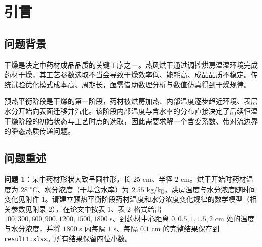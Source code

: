 \section{引言}

\subsection{问题背景}
干燥是决定中药材成品品质的关键工序之一。热风烘干通过调控烘房温湿环境完成药材干燥，其工艺参数选取不当会导致干燥效率低、能耗高、成品品质不稳定。传统试验优化模式成本高、周期长，亟需借助数理分析与数值仿真得到干燥规律。

预热平衡阶段是干燥的第一阶段，药材被烘房加热、内部温度逐步趋近环境、表层水分开始向表面迁移并汽化。该阶段内部温度与含水率的分布直接决定了后续恒温干燥阶段的初始状态与工艺时点的选取，因此需要求解一个含变系数、带对流边界的瞬态热质传递问题。

\subsection{问题重述}
\textbf{问题 1}：某中药材形状大致呈圆柱形，长 $25$ cm、半径 $2$ cm。烘干开始时药材温度为 $28$ $^\circ$C、水分浓度（干基含水率）为 $2.55$ kg/kg，烘房温度与水分浓度随时间变化见附件 1。请建立预热平衡阶段药材温度和水分浓度变化规律的数学模型（相关参数见附录 2），在论文中按表 1、表 2 格式给出 $100,300,600,900,1200,1500,1800$ s、到药材中心距离 $0,0.5,1,1.5,2$ cm 处的温度与水分浓度，并将 $1800$ s 内每隔 $1$ s、每隔 $0.1$ cm 的完整结果保存到 \texttt{result1.xlsx}。所有结果保留四位小数。
